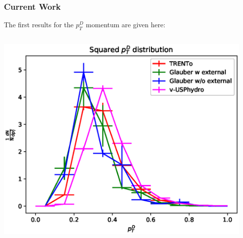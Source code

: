 \documentclass{beamer}
\begin{document}
\begin{frame}\frametitle{Current Work}
	\begin{minipage}{1\textwidth}
	The first results for the $p_{T}^{D}$ momentum are given here:
    \end{minipage}
    \begin{columns}
    \begin{column}{0.5\textwidth}
	\begin{minipage}[l]{0.5\textwidth}
	\includegraphics[scale=0.4]{images/Squared.eps}
	\end{minipage}
	\end{column}
    \begin{column}{0.4\textwidth}
	\begin{minipage}[r]{1\textwidth}
	
	\end{minipage}
	\end{column}
	\end{columns}
\end{frame}
\end{document}
